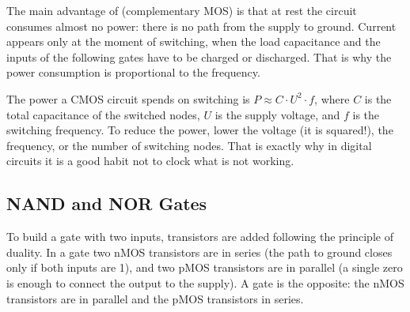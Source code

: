 The main advantage of  (complementary MOS) is that at rest the circuit
consumes almost no power: there is no path from the supply to ground. Current
appears only at the moment of switching, when the load capacitance and the inputs of
the following gates have to be charged or discharged. That is why the power consumption
is proportional to the frequency.

\begin{ideabox}
The power a CMOS circuit spends on switching is
$P \approx C\cdot U^2\cdot f$, where $C$ is the total capacitance of the switched
nodes, $U$ is the supply voltage, and $f$ is the switching frequency. To
reduce the power, lower the voltage (it is squared!),
the frequency, or the number of switching nodes. That is exactly why in digital circuits
it is a good habit not to clock what is not working.
\end{ideabox}

\subsection{NAND and NOR Gates}

To build a gate with two inputs, transistors are added following
the principle of duality. In a  gate two nMOS transistors are in
series (the path to ground closes only if both inputs are 1), and
two pMOS transistors are in parallel (a single zero is enough to connect the output to
the supply). A  gate is the opposite: the nMOS transistors are in parallel and the pMOS transistors
in series.

